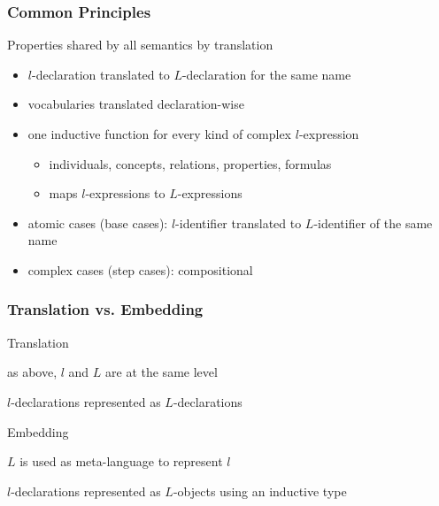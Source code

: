 \begin{frame}\frametitle{Common Principles}
Properties shared by all semantics by translation
\begin{itemize}
 \item $l$-declaration translated to $L$-declaration for the same name
 \item vocabularies translated declaration-wise
 \item one inductive function for every kind of complex $l$-expression
  \begin{itemize}
   \item individuals, concepts, relations, properties, formulas
   \item maps $l$-expressions to $L$-expressions
  \end{itemize}
 \item atomic cases (base cases): $l$-identifier translated to $L$-identifier of the same name
 \item complex cases (step cases): compositional
\end{itemize}
\end{frame}

\begin{frame}\frametitle{Translation vs. Embedding}
\begin{blockitems}{Translation}
\item as above, $l$ and $L$ are at the same level
\item $l$-declarations represented as $L$-declarations
\end{blockitems}

\begin{blockitems}{Embedding}
\item $L$ is used as meta-language to represent $l$
\item $l$-declarations represented as $L$-objects using an inductive type
\end{blockitems}
\end{frame}

